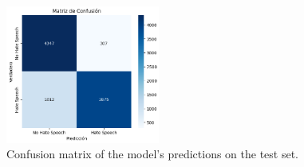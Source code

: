 \begin{figure}[H]
    \centering
    \includegraphics[width=0.45\textwidth]{images/matrixOfCconfusion.png}
    \caption{Confusion matrix of the model's predictions on the test set.}
    \label{fig:confusion_matrix}
\end{figure}
